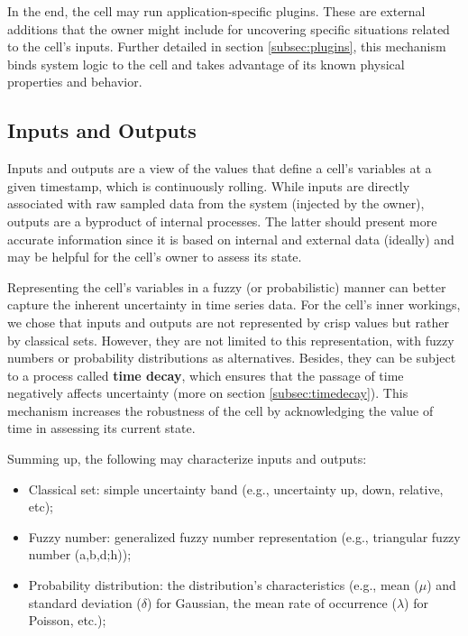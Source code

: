 In the end, the cell may run application-specific plugins. These are external additions that the owner might include for uncovering specific situations related to the cell's inputs. Further detailed in section \ref{subsec:plugins}, this mechanism binds system logic to the cell and takes advantage of its known physical properties and behavior.

\subsection{Inputs and Outputs} \label{subsec:inout}

Inputs and outputs are a view of the values that define a cell's variables at a given timestamp, which is continuously rolling. While inputs are directly associated with raw sampled data from the system (injected by the owner), outputs are a byproduct of internal processes. The latter should present more accurate information since it is based on internal and external data (ideally) and may be helpful for the cell's owner to assess its state.

Representing the cell's variables in a fuzzy (or probabilistic) manner can better capture the inherent uncertainty in time series data. For the cell's inner workings, we chose that inputs and outputs are not represented by crisp values but rather by classical sets. However, they are not limited to this representation, with fuzzy numbers or probability distributions as alternatives. Besides, they can be subject to a process called \textbf{time decay}, which ensures that the passage of time negatively affects uncertainty (more on section \ref{subsec:timedecay}). This mechanism increases the robustness of the cell by acknowledging the value of time in assessing its current state.

Summing up, the following may characterize inputs and outputs:

\begin{itemize}
    \item Classical set: simple uncertainty band (e.g., uncertainty up, down, relative, etc);
    \item Fuzzy number: generalized fuzzy number representation \cite{Zhang2019} (e.g., triangular fuzzy number (a,b,d;h));
    \item Probability distribution: the distribution's characteristics (e.g., mean ($\mu$) and standard deviation ($\delta$) for Gaussian, the mean rate of occurrence ($\lambda$) for Poisson, etc.);
\end{itemize}

